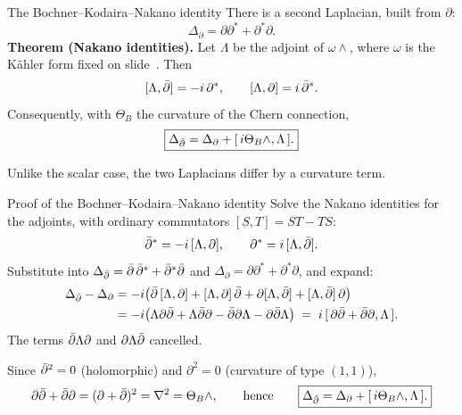 \begin{frame}{The Bochner--Kodaira--Nakano identity}
\label{fr:the-bochner-kodaira-nakano-15}
There is a second Laplacian, built from \(\partial\):
\[
\Delta_{\partial}=\partial\partial^*+\partial^*\partial .
\]
\textbf{Theorem (Nakano identities).} Let \(\Lambda\) be the adjoint of \(\omega\wedge\), where \(\omega\) is the Kähler form fixed on slide~\hyperlink{fr:hodge-theory-with-values-14}{\pageref{fr:hodge-theory-with-values-14}}. Then
\[
[\Lambda,\bar\partial]=-i\,\partial^*,
\qquad
[\Lambda,\partial]=i\,\bar\partial^*.
\]
Consequently, with \(\Theta_B\) the curvature of the Chern connection,
\[
\boxed{\Delta_{\bar\partial}=\Delta_{\partial}+[\,i\Theta_B\wedge,\Lambda\,].}
\]
\par\medskip
Unlike the scalar case, the two Laplacians differ by a curvature term.
\end{frame}

\begin{frame}{Proof of the Bochner--Kodaira--Nakano identity}
Solve the Nakano identities for the adjoints, with ordinary commutators \([S,T]=ST-TS\):
\[
\bar\partial^*=-i\,[\Lambda,\partial],\qquad \partial^*=i\,[\Lambda,\bar\partial].
\]
Substitute into \(\Delta_{\bar\partial}=\bar\partial\,\bar\partial^*+\bar\partial^*\bar\partial\) and \(\Delta_{\partial}=\partial\partial^*+\partial^*\partial\), and expand:
\[
\begin{aligned}
\Delta_{\bar\partial}-\Delta_{\partial}
&=-i\bigl(\bar\partial\,[\Lambda,\partial]+[\Lambda,\partial]\,\bar\partial+\partial[\Lambda,\bar\partial]+[\Lambda,\bar\partial]\,\partial\bigr)\\
&=-i\bigl(\Lambda\partial\bar\partial+\Lambda\bar\partial\partial-\bar\partial\partial\Lambda-\partial\bar\partial\Lambda\bigr)
\;=\;i\,[\,\partial\bar\partial+\bar\partial\partial,\Lambda\,].
\end{aligned}
\]
The terms \(\bar\partial\Lambda\partial\) and \(\partial\Lambda\bar\partial\) cancelled.
\par\medskip
Since \(\bar\partial^2=0\) (holomorphic) and \(\partial^2=0\) (curvature of type \((1,1)\)),
\[
\partial\bar\partial+\bar\partial\partial=(\partial+\bar\partial)^2=\nabla^2=\Theta_B\wedge,
\qquad\text{hence}\qquad
\boxed{\Delta_{\bar\partial}=\Delta_{\partial}+[\,i\Theta_B\wedge,\Lambda\,].}
\]
\end{frame}

